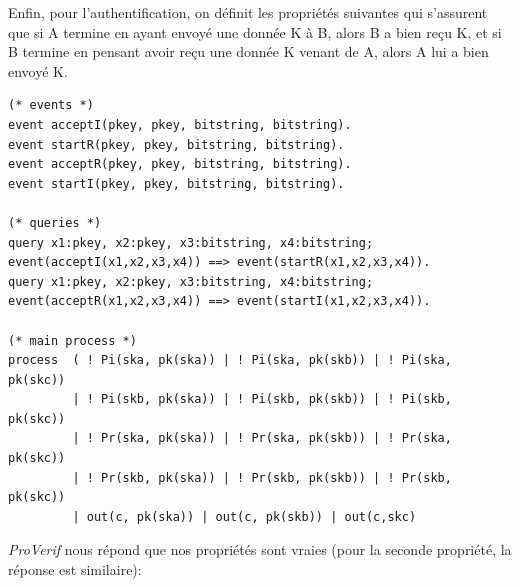 \documentclass[10pt,a4paper]{article}
\begin{document}
Enfin, pour l'authentification, on définit les propriétés suivantes qui s'assurent que si A termine en ayant envoyé une donnée K à B, alors B a bien reçu K, et si B termine en pensant avoir reçu une donnée K venant de A, alors A lui a bien envoyé K.
\begin{Verbatim}[fontsize=\scriptsize]
(* events *)
event acceptI(pkey, pkey, bitstring, bitstring).
event startR(pkey, pkey, bitstring, bitstring).
event acceptR(pkey, pkey, bitstring, bitstring).
event startI(pkey, pkey, bitstring, bitstring).

(* queries *)
query x1:pkey, x2:pkey, x3:bitstring, x4:bitstring; event(acceptI(x1,x2,x3,x4)) ==> event(startR(x1,x2,x3,x4)).
query x1:pkey, x2:pkey, x3:bitstring, x4:bitstring; event(acceptR(x1,x2,x3,x4)) ==> event(startI(x1,x2,x3,x4)).

(* main process *)
process  ( ! Pi(ska, pk(ska)) | ! Pi(ska, pk(skb)) | ! Pi(ska, pk(skc))
         | ! Pi(skb, pk(ska)) | ! Pi(skb, pk(skb)) | ! Pi(skb, pk(skc))
         | ! Pr(ska, pk(ska)) | ! Pr(ska, pk(skb)) | ! Pr(ska, pk(skc))
         | ! Pr(skb, pk(ska)) | ! Pr(skb, pk(skb)) | ! Pr(skb, pk(skc))
         | out(c, pk(ska)) | out(c, pk(skb)) | out(c,skc)
\end{Verbatim}
\textit{ProVerif} nous répond que nos propriétés sont vraies (pour la seconde propriété, la réponse est similaire):
\end{document}
